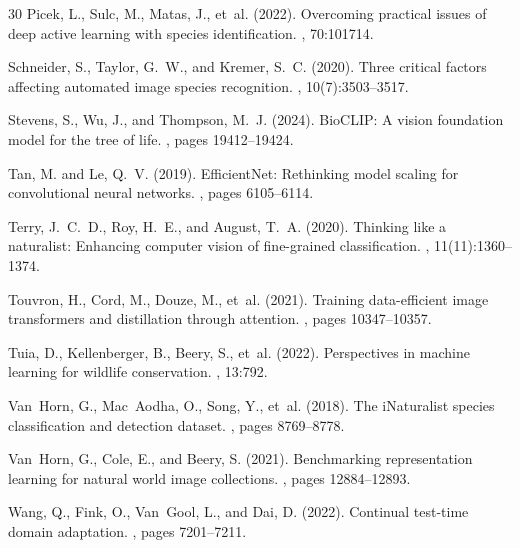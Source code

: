\begin{thebibliography}{30}
Picek, L., Sulc, M., Matas, J., et~al. (2022).
\newblock Overcoming practical issues of deep active learning with species identification.
, 70:101714.

Schneider, S., Taylor, G.~W., and Kremer, S.~C. (2020).
\newblock Three critical factors affecting automated image species recognition.
, 10(7):3503--3517.

Stevens, S., Wu, J., and Thompson, M.~J. (2024).
\newblock BioCLIP: A vision foundation model for the tree of life.
, pages 19412--19424.

Tan, M. and Le, Q.~V. (2019).
\newblock EfficientNet: Rethinking model scaling for convolutional neural networks.
, pages 6105--6114.

Terry, J.~C.~D., Roy, H.~E., and August, T.~A. (2020).
\newblock Thinking like a naturalist: Enhancing computer vision of fine-grained classification.
, 11(11):1360--1374.

Touvron, H., Cord, M., Douze, M., et~al. (2021).
\newblock Training data-efficient image transformers and distillation through attention.
, pages 10347--10357.

Tuia, D., Kellenberger, B., Beery, S., et~al. (2022).
\newblock Perspectives in machine learning for wildlife conservation.
, 13:792.

Van~Horn, G., Mac~Aodha, O., Song, Y., et~al. (2018).
\newblock The iNaturalist species classification and detection dataset.
, pages 8769--8778.

Van~Horn, G., Cole, E., and Beery, S. (2021).
\newblock Benchmarking representation learning for natural world image collections.
, pages 12884--12893.

Wang, Q., Fink, O., Van~Gool, L., and Dai, D. (2022).
\newblock Continual test-time domain adaptation.
, pages 7201--7211.


\end{thebibliography}

